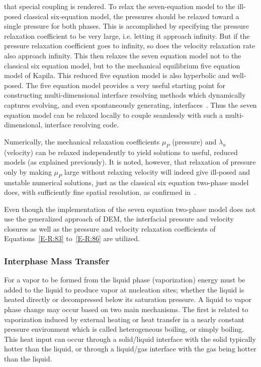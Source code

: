 that special coupling is rendered.  To relax the seven-equation model to
the ill-posed classical six-equation model, the pressures should be
relaxed toward a single pressure for both phases.  This is
accomplished by specifying the pressure relaxation coefficient to be
very large, i.e. letting it approach infinity.  But if the pressure
relaxation coefficient goes to infinity, so does the velocity
relaxation rate also approach infinity.  This then relaxes the
seven equation model not to the classical six equation model, but to the
mechanical equilibrium five equation model of Kapila.  This reduced
five equation model is also hyperbolic and well-posed. The five equation
model provides a very useful starting point for constructing
multi-dimensional interface resolving methods which dynamically
captures evolving, and even spontaneously generating,
interfaces~\cite{Saurel_2009}. Thus the seven equation model
can be relaxed locally to couple seamlessly with such a
multi-dimensional, interface resolving code.

Numerically, the mechanical relaxation coefficients $\mu_P$
(pressure) and $\lambda_u$ (velocity) can be relaxed independently to
yield solutions to useful, reduced models (as explained previously).  It
is noted, however, that relaxation of pressure only by making $\mu_P$
large without relaxing velocity will indeed give ill-posed and
unstable numerical solutions, just as the classical six equation
two-phase model does, with sufficiently fine spatial resolution, as
confirmed in~\cite{SEM,Herrard_2005}.

Even though the implementation of the seven equation two-phase
model does not use
the generalized approach of DEM, the interfacial pressure and velocity
closures as well as the pressure and velocity relaxation coefficients
of Equations~\eqref{E-R:83} to~\eqref{E-R:86} are utilized.
\subsubsection{Interphase Mass Transfer}
For a vapor to be formed from the liquid phase (vaporization) energy
must be added to the liquid to produce vapor at nucleation sites;
whether the liquid is heated directly or decompressed below its
saturation pressure.  A liquid to vapor phase change may occur based
on two main mechanisms.  The first is related to vaporization induced
by external heating or heat transfer in a nearly constant pressure
environment which is called heterogeneous boiling, or simply
boiling.  This heat input can occur through a solid/liquid
interface with the solid typically hotter than the liquid, or through
a liquid/gas interface with the gas being hotter than the liquid.

